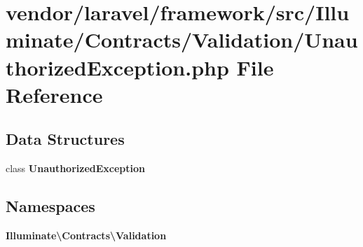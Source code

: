 \section{vendor/laravel/framework/src/\+Illuminate/\+Contracts/\+Validation/\+Unauthorized\+Exception.php File Reference}
\label{_unauthorized_exception_8php}
\subsection*{Data Structures}
\begin{DoxyCompactItemize}
\item 
class {\bf Unauthorized\+Exception}
\end{DoxyCompactItemize}
\subsection*{Namespaces}
\begin{DoxyCompactItemize}
\item 
 {\bf Illuminate\textbackslash{}\+Contracts\textbackslash{}\+Validation}
\end{DoxyCompactItemize}

